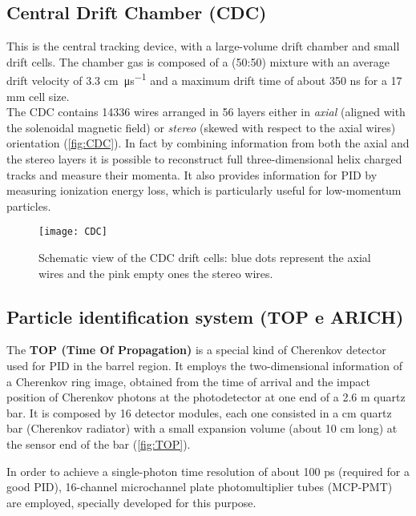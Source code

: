 \subsection{Central Drift Chamber (CDC)}

This is the central tracking device, with a large-volume drift chamber and small drift cells. The chamber gas is composed of a  (50:50) mixture with an average drift velocity of 3.3 \unit{\centi\meter.\micro\second^{-1}} and a maximum drift time of about 350 ns for a 17 mm cell size.\\
The CDC contains 14336 wires arranged in 56 layers either in \emph{axial}  (aligned with the solenoidal magnetic field) or \emph{stereo} (skewed with respect to the axial wires) orientation (\autoref{fig:CDC}). 
In fact by combining information from both the axial and the stereo layers it is possible to reconstruct full three-dimensional helix charged tracks and measure their momenta.
It also provides information for PID by measuring ionization energy loss, which is particularly useful for low-momentum particles.

\begin{figure}[h!]
\centering
\texttt{[image: CDC]}
\caption{Schematic view of the CDC drift cells: blue dots represent the axial wires and the pink empty ones the stereo wires.}
\label{fig:CDC}
\end{figure}


\subsection{Particle identification system (TOP e ARICH)}

The \textbf{TOP (Time Of Propagation)} is a special kind of Cherenkov detector used for PID in the barrel region. It employs the two-dimensional information of a Cherenkov ring image, obtained from the time of arrival and the impact position of Cherenkov photons at the photodetector at one end of a 2.6 m quartz bar. It is composed by 16 detector modules, each one consisted in a  cm quartz bar (Cherenkov radiator) with a small expansion volume (about 10 cm long) at the sensor end of the bar (\autoref{fig:TOP}). 

In order to achieve a single-photon time resolution of about 100 ps (required for a good PID), 16-channel microchannel plate photomultiplier tubes (MCP-PMT) are employed, specially developed for this purpose.\\

